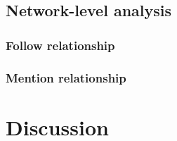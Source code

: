 \documentclass[letterpaper]{article}
\begin{document}
\subsection{Network-level analysis}

\subsubsection{Follow relationship}

\subsubsection{Mention relationship}

\section{Discussion}



\end{document}
